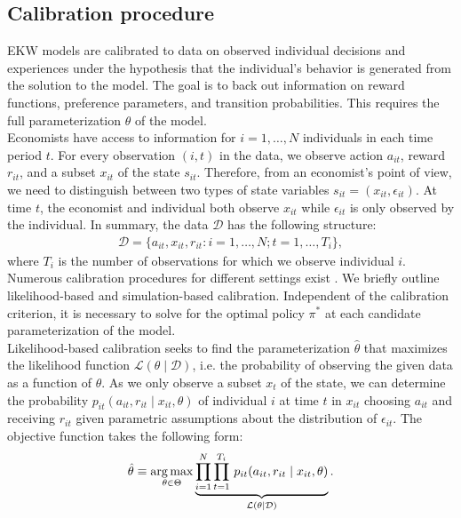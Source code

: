 \subsection{Calibration procedure}
EKW models are calibrated to data on observed individual decisions and experiences under the hypothesis that the individual's behavior is generated from the solution to the model. The goal is to back out information on reward functions, preference parameters, and transition probabilities. This requires the full parameterization $\theta$ of the model.\\

\noindent Economists have access to information for $i = 1, \hdots, N$ individuals in each time period $t$. For every observation $(i, t)$ in the data, we observe action $a_{it}$, reward $r_{it}$, and a subset $x_{it}$ of the state $s_{it}$. Therefore, from an economist's point of view, we need to distinguish between two types of state variables $s_{it} = (x_{it}, \epsilon_{it})$. At time $t$, the economist and individual both observe $x_{it}$ while $\epsilon_{it}$ is only observed by the individual. In summary, the data $\mathcal{D}$ has the following structure:
%
\begin{align*}
  \mathcal{D} = \{a_{it}, x_{it}, r_{it}: i = 1, \hdots, N; t = 1, \hdots, T_i\},
\end{align*}
where $T_i$ is the number of observations for which we observe individual $i$.\\

\noindent Numerous calibration procedures for different settings exist \citep{Davidson.2003, Gourieroux.1996}. We briefly outline likelihood-based and simulation-based calibration. Independent of the calibration criterion, it is necessary to solve for the optimal policy $\pi^*$ at each candidate parameterization of the model.\\

\noindent Likelihood-based calibration seeks to find the parameterization $\hat{\theta}$ that maximizes the likelihood function $\mathcal{L}(\theta\mid\mathcal{D})$, i.e. the probability of observing the given data as a function of $\theta$. As we only observe a subset $x_t$ of the state, we can determine the probability $p_{it}(a_{it}, r_{it} \mid x_{it}, \theta)$ of individual $i$ at time $t$ in $x_{it}$ choosing $a_{it}$ and receiving $r_{it}$ given parametric assumptions about the distribution of $\epsilon_{it}$. The objective function takes the following form:
%
\begin{align*}
  \hat{\theta} \equiv \operatorname*{arg\,max}_{\theta \in \Theta}  \underbrace{\prod^N_{i= 1} \prod^{T_i}_{t= 1}\, p_{it}(a_{it}, r_{it} \mid x_{it}, \theta)}_{\mathcal{L}(\theta\mid\mathcal{D})}.
\end{align*}


